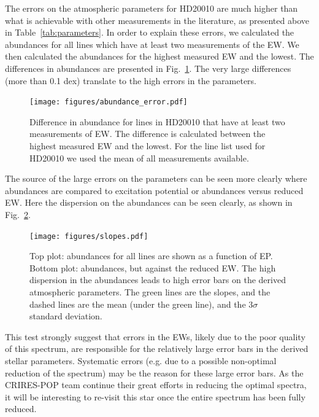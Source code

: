 \documentclass{aa}
\begin{document}
The errors on the atmospheric parameters for HD20010 are much
higher than what is achievable with other measurements in the
literature, as presented above in Table~\ref{tab:parameters}. In order
to explain these errors, we calculated the abundances for all lines
which have at least two measurements of the EW. We then calculated the
abundances for the highest measured EW and the lowest. The differences
in abundances are presented in Fig.~\ref{fig:abundance_error}. The very
large differences (more than 0.1 dex) translate to the high errors in
the parameters.

\begin{figure}[tpb!]
    \centering
    \texttt{[image: figures/abundance\_error.pdf]}
    \caption{Difference in abundance for lines in HD20010 that
    have at least two measurements of EW. The difference is calculated
    between the highest measured EW and the lowest. For the line list
    used for HD20010 we used the mean of all measurements available.}
    \label{fig:abundance_error}
\end{figure}

The source of the large errors on the parameters can be seen more
clearly where abundances are compared to excitation potential or
abundances versus reduced EW. Here the dispersion on the abundances can
be seen clearly, as shown in Fig.~\ref{fig:slopes}.

\begin{figure}[tpb!]
    \centering
    \texttt{[image: figures/slopes.pdf]}
    \caption{Top plot:  abundances for all
    lines are shown as a function of EP. Bottom plot:  abundances, but against the reduced EW. The high
    dispersion in the abundances leads to high error bars on the derived
    atmospheric parameters. The green lines are the slopes, and the
    dashed lines are the mean (under the green line), and the $3 \sigma$
    standard deviation.}
    \label{fig:slopes}
\end{figure}

This test strongly suggest that errors in the EWs, likely due to the
poor quality of this spectrum, are responsible for the relatively large
error bars in the derived stellar parameters. Systematic errors (e.g.
due to a possible non-optimal reduction of the spectrum) may be the
reason for these large error bars. As the CRIRES-POP team continue their
great efforts in reducing the optimal spectra, it will be interesting to
re-visit this star once the entire spectrum has been fully reduced.
\end{document}
